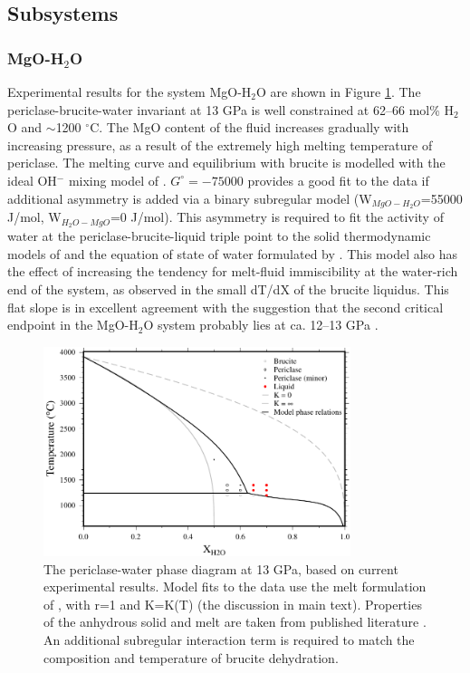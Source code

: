 \documentclass[review]{elsarticle}
\begin{document}
\subsection{Subsystems}
\subsubsection{MgO-H$_2$O}
Experimental results for the system MgO-H$_2$O are shown in Figure \ref{fig:MH}. The periclase-brucite-water invariant at 13 GPa is well constrained at 62--66 mol\% H$_2$O and $\sim$1200 $^{\circ}$C. The MgO content of the fluid increases gradually with increasing pressure, as a result of the extremely high melting temperature of periclase. The melting curve and equilibrium with brucite is modelled with the ideal OH$^-$ mixing model of \cite{SS1985}. $G^{\circ}= -75000$ provides a good fit to the data if additional asymmetry is added via a binary subregular model (W$_{MgO-H_2O}$=55000 J/mol, W$_{H_2O-MgO}$=0 J/mol). This asymmetry is required to fit the activity of water at the periclase-brucite-liquid triple point to the solid thermodynamic models of \citep{HP2011} and the equation of state of water formulated by \cite{PS1995}. This model also has the effect of increasing the tendency for melt-fluid immiscibility at the water-rich end of the system, as observed in the small dT/dX of the brucite liquidus. This flat slope is in excellent agreement with the suggestion that the second critical endpoint in the MgO-H$_2$O system probably lies at ca. 12--13 GPa \citep{MSUP2007}.

\begin{figure}[ht!]
  \centering
      \includegraphics[width=0.8\textwidth]{figures/periclase}
  \caption{The periclase-water phase diagram at 13 GPa, based on current experimental results. Model fits to the data use the melt formulation of \cite{SS1985}, with r=1 and K=K(T) (the discussion in main text). Properties of the anhydrous solid and melt are taken from published literature \citep{SLB2011, DKS2013}. An additional subregular interaction term is required to match the composition and temperature of brucite dehydration.}
  \label{fig:MH}
\end{figure}
\end{document}
